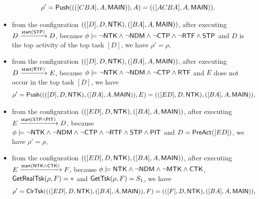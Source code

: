 \begin{example}
\begin{itemize}
		$$\rho' = \mathsf{Push}((([CBA], A, {\sf MAIN})), A) = (([ACBA], A, {\sf MAIN})),$$
        \item from the configuration $(([D],D,{\sf NTK}),([BA], A, {\sf MAIN}))$,  after executing  $D \xrightarrow{{\mathsf{start} }({\sf STP})} D$, because $\phi \models \neg {\sf NTK} \wedge \neg {\sf NDM}\wedge\neg{\sf CTP}\wedge\neg{\sf RTF}\wedge{\sf STP}$ and $D$ is the top activity of the top task $[D]$, we have $\rho' = \rho$,
        \item from the configuration $(([D],D,{\sf NTK}),([BA], A, {\sf MAIN}))$, after executing $D \xrightarrow{{\mathsf{start} }({\sf RTF})} E$, because $\phi \models \neg {\sf NTK} \wedge \neg {\sf NDM}\wedge\neg{\sf CTP}\wedge{\sf RTF}$ and $E$ dose not occur in the top task $[D]$, we have 
		$$\rho' = \mathsf{Push}((([D],D,{\sf NTK}),([BA], A, {\sf MAIN})), E) = (([ED],D,{\sf NTK}),([BA], A, {\sf MAIN})),$$
        \item from the configuration $(([ED],D,{\sf NTK}),([BA], A, {\sf MAIN}))$, after executing $E \xrightarrow{{\mathsf{start} }({\sf STP}\wedge{\sf PIT})} D$, because $\phi \models \neg {\sf NTK} \wedge \neg {\sf NDM}\wedge\neg{\sf CTP}\wedge\neg{\sf RTF}\wedge{\sf STP}\wedge{\sf PIT}$ and $D = \mathsf{PreAct}([ED])$, we have $\rho' = \rho$, 
        \item from the configuration $(([ED],D,{\sf NTK}),([BA], A, {\sf MAIN}))$, after executing $E \xrightarrow{{\mathsf{start} }({\sf NTK}\wedge{\sf CTK})} F$,  because $\phi \models {\sf NTK} \wedge \neg {\sf NDM}\wedge\neg{\sf MTK}\wedge{\sf CTK}$, $\mathsf{GetRealTsk}(\rho,F) = *$ and $\mathsf{GetTsk}(\rho,F) = S_1$, we have 
		$$\rho' = \mathsf{ClrTsk}((([ED],D,{\sf NTK}),([BA], A, {\sf MAIN})), F) = (([F],D,{\sf NTK}),([BA], A, {\sf MAIN})),$$
\end{itemize}
\end{example}
